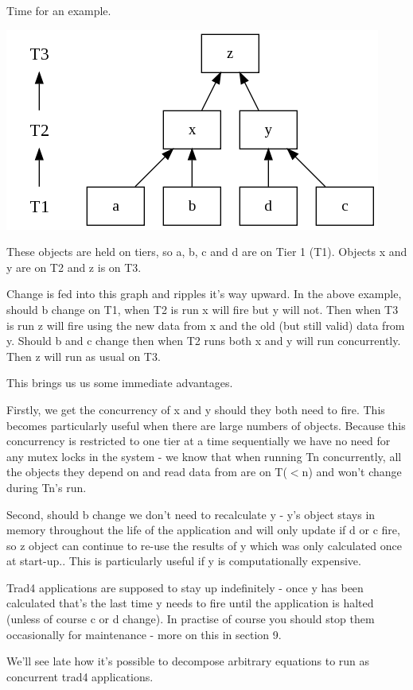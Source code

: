\documentclass{report}
\begin{document}
Time for an example.

\includegraphics[scale=0.5]{simplemathsabstract.png}

These objects are held on tiers, so a, b, c and d are on Tier 1 (T1). Objects x and y are on T2 and z is on T3. 

Change is fed into this graph and ripples it's way upward. In the above example, should b change on T1, when T2 is run x will fire but y will not. Then when T3 is run z will fire using the new data from x and the old (but still valid) data from y. Should b and c change then when T2 runs both x and  y will run concurrently. Then z will run as usual on T3.

This brings us us some immediate advantages. 

Firstly, we get the concurrency of x and y should they both need to fire. This becomes particularly useful when there are large numbers of objects. Because this concurrency is restricted to one tier at a time sequentially we have no need for any mutex locks in the system - we know that when running Tn concurrently, all the objects they depend on and read data from are on T($<$n) and won't change during Tn's run.

Second, should b change we don't need to recalculate y - y's object stays in memory throughout the life of the application and will only update if d or c fire, so z object can continue to re-use the results of y which was only calculated once at start-up.. This is particularly useful if y is computationally expensive.

Trad4 applications are supposed to stay up indefinitely - once y has been calculated that's the last time y needs to fire until the application is halted (unless of course c or d change). In practise of course you should stop them occasionally for maintenance - more on this in section 9.

We'll see late how it's possible to decompose arbitrary equations to run as concurrent trad4 applications.
\end{document}
